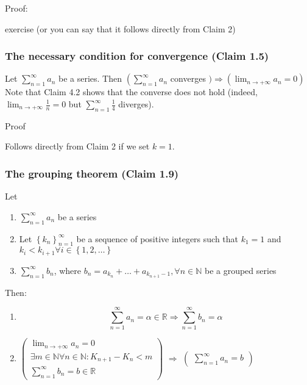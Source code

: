 Proof:

exercise (or you can say that it follows directly from Claim 2)

\subsubsection{The necessary condition for convergence (Claim 1.5)}

Let \(\sum_{n=1}^{\infty} a_n\) be a series.
Then \(\left(\sum_{n=1}^{\infty} a_n\right.\) converges \() \Rightarrow\left(\lim _{n \rightarrow+\infty} a_n=0\right)\)
Note that Claim 4.2 shows that the converse does not hold (indeed, \(\lim _{n \rightarrow+\infty} \frac{1}{n}=0\) but \(\sum_{n=1}^{\infty} \frac{1}{4}\) diverges).

Proof

Follows directly from Claim 2 if we set \(k=1\).

\subsubsection{The grouping theorem (Claim 1.9)}

Let

\begin{enumerate}
    \item \(\sum_{n = 1}^{\infty} a_n\) be a series
    \item Let \(\left\{ k_n \right\}_{n = 1}^{\infty}\) be a sequence of positive integers such that \(k_1 = 1\) and \(k_i < k_{i + 1} \forall i \in \left\{ 1, 2, \dots \right\}\)
    \item \(\sum_{n = 1}^{\infty} b_n\), where \(b_n = a_{k_n} + \dots + a_{k_{n+1}-1}, \forall n \in \mathbb{N}\) be a grouped series
\end{enumerate}

Then:

\begin{enumerate}
    \item
    \[
        \sum_{n = 1}^{\infty} a_n = \alpha \in \mathbb{R} \Rightarrow \sum_{n = 1}^{\infty} b_n = \alpha
    \]
    \item
    $\begin{pmatrix}
         \lim_{n \rightarrow + \infty} a_n = 0                                  \\
         \exists m \in \mathbb{N} \forall n \in \mathbb{N}: K_{n + 1} - K_n < m \\
         \sum_{n = 1}^{\infty} b_n = b \in \mathbb{R}
    \end{pmatrix}$ \(\Rightarrow\)
    $\begin{pmatrix}
         \sum_{n = 1}^{\infty} a_n = b
    \end{pmatrix}$
\end{enumerate}


